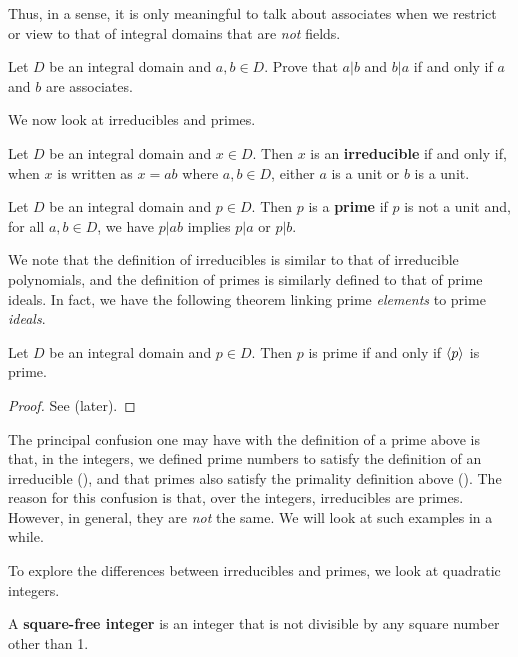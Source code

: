 Thus, in a sense, it is only meaningful to talk about associates when we restrict or view to that of integral domains that are \textit{not} fields.

\begin{exercise}
    Let $D$ be an integral domain and $a,b \in D$. Prove that $a \vert b$ and $b \vert a$ if and only if $a$ and $b$ are associates.
\end{exercise}

We now look at irreducibles and primes.
\begin{definition}
    Let $D$ be an integral domain and $x \in D$. Then $x$ is an \textbf{irreducible} if and only if, when $x$ is written as $x = ab$ where $a, b \in D$, either $a$ is a unit or $b$ is a unit.
\end{definition}
\begin{definition}
    Let $D$ be an integral domain and $p \in D$. Then $p$ is a \textbf{prime} if $p$ is not a unit and, for all $a, b \in D$, we have $p \vert ab$ implies $p \vert a$ or $p \vert b$.
\end{definition}

We note that the definition of irreducibles is similar to that of irreducible polynomials, and the definition of primes is similarly defined to that of prime ideals. In fact, we have the following theorem linking prime \textit{elements} to prime \textit{ideals}.
\begin{theorem}\label{thrm-prime-element-iff-generates-prime-ideal}
    Let $D$ be an integral domain and $p \in D$. Then $p$ is prime if and only if $\left\langle p\right\rangle$ is prime.
\end{theorem}
\begin{proof}
    See  (later).
\end{proof}

The principal confusion one may have with the definition of a prime above is that, in the integers, we defined prime numbers to satisfy the definition of an irreducible (), and that primes also satisfy the primality definition above (). The reason for this confusion is that, over the integers, irreducibles are primes. However, in general, they are \textit{not} the same. We will look at such examples in a while.

To explore the differences between irreducibles and primes, we look at quadratic integers.
\begin{definition}
    A \textbf{square-free integer} is an integer that is not divisible by any square number other than 1.
\end{definition}


